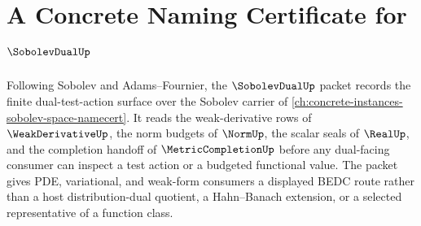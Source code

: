 \chapter{A Concrete Naming Certificate for $\SobolevDualUp$}
\label{ch:concrete-instances-sobolev-dual-namecert}

Following Sobolev and Adams--Fournier, the $\SobolevDualUp$ packet records the finite dual-test-action surface over the Sobolev carrier of \autoref{ch:concrete-instances-sobolev-space-namecert}. It reads the weak-derivative rows of $\WeakDerivativeUp$, the norm budgets of $\NormUp$, the scalar seals of $\RealUp$, and the completion handoff of $\MetricCompletionUp$ before any dual-facing consumer can inspect a test action or a budgeted functional value. The packet gives PDE, variational, and weak-form consumers a displayed BEDC route rather than a host distribution-dual quotient, a Hahn--Banach extension, or a selected representative of a function class.

